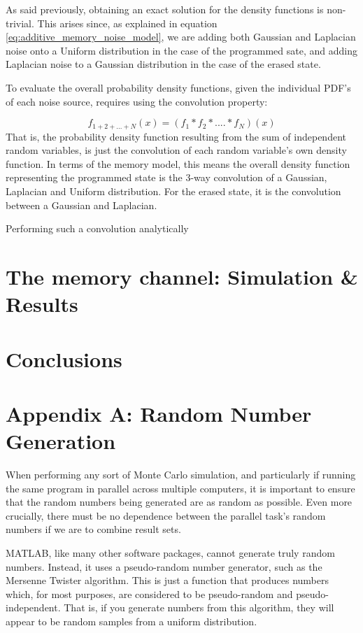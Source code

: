 \documentclass[11pt]{article}
\numberwithin{equation}{subsection}
\begin{document}
As said previously, obtaining an exact solution for the density functions is non-trivial. This arises since, as explained in equation \ref{eq:additive_memory_noise_model}, we are adding both Gaussian and Laplacian noise onto a Uniform distribution in the case of the programmed sate, and adding Laplacian noise to a Gaussian distribution in the case of the erased state.

To evaluate the overall probability density functions, given the individual PDF's of each noise source, requires using the convolution property:

\begin{equation}
f_{1+2+...+N}(x) = (f_1 \ast f_2 \ast .... \ast f_N)(x)
\end{equation}
That is, the probability density function resulting from the sum of independent random variables, is just the convolution of each random variable's own density function. In terms of the memory model, this means the overall density function representing the programmed state is the 3-way convolution of a Gaussian, Laplacian and Uniform distribution. For the erased state, it is the convolution between a Gaussian and Laplacian. 

Performing such a convolution analytically 
\section{The memory channel: Simulation \& Results}

\section{Conclusions}

{}
\section*{Appendix A: Random Number Generation}
When performing any sort of Monte Carlo simulation, and particularly if running the same program in parallel across multiple computers, it is important to ensure that the random numbers being generated are as random as possible. Even more crucially, there must be no dependence between the parallel task's random numbers if we are to combine result sets.

MATLAB, like many other software packages, cannot generate truly random numbers. Instead, it uses a pseudo-random number generator, such as the Mersenne Twister algorithm. This is just a function that produces numbers which, for most purposes, are considered to be pseudo-random and pseudo-independent. That is, if you generate numbers from this algorithm, they will appear to be random samples from a uniform distribution. 
\end{document}
